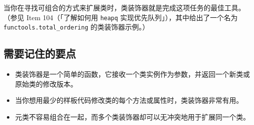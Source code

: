 当你在寻找可组合的方式来扩展类时，类装饰器就是完成这项任务的最佳工具。（参见 Item 104（「了解如何用 \texttt{heapq} 实现优先队列」），其中给出了一个名为 \texttt{functools.total\_ordering} 的类装饰器示例。）

\subsection{需要记住的要点}

\begin{itemize}
\item 类装饰器是一个简单的函数，它接收一个类实例作为参数，并返回一个新类或原始类的修改版本。
\item 当你想用最少的样板代码修改类的每个方法或属性时，类装饰器非常有用。
\item 元类不容易组合在一起，而多个类装饰器却可以无冲突地用于扩展同一个类。
\end{itemize}
